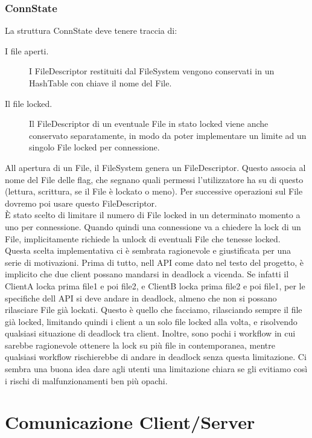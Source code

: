 \documentclass[11pt]{article}
\begin{document}
\begin{flushleft}
\subsubsection{ConnState}

La struttura ConnState deve tenere traccia di:
\begin{description}

\item[I file aperti.] I FileDescriptor restituiti dal FileSystem vengono conservati in un HashTable con chiave il nome del File.

\item[Il file locked.] Il FileDescriptor di un eventuale File in stato locked viene anche conservato separatamente, in modo da poter implementare un limite ad un singolo File locked per connessione.

\end{description}
All apertura  di un File, il FileSystem genera un FileDescriptor. Questo associa al nome del File delle flag, che segnano quali permessi l'utilizzatore ha su di questo (lettura, scrittura, se il File è lockato o meno). Per successive operazioni sul File dovremo poi usare questo FileDescriptor.
\\
È stato scelto di limitare il numero di File locked in un determinato momento a uno per connessione. Quando quindi una connessione va a chiedere la lock di un File, implicitamente richiede la unlock di eventuali File che tenesse locked.
Questa scelta implementativa ci è sembrata ragionevole e giustificata per una serie di motivazioni.
Prima di tutto, nell API come dato nel testo del progetto, è implicito che due client possano mandarsi in deadlock a vicenda. Se infatti il ClientA locka prima file1 e poi file2, e ClientB locka prima file2 e poi file1, per le specifiche dell API si deve andare in deadlock, almeno che non si possano rilasciare File già lockati. Questo è quello che facciamo, rilasciando sempre il file già locked, limitando quindi i client a un solo file locked alla volta, e risolvendo qualsiasi situazione di deadlock tra client.
Inoltre, sono pochi i workflow in cui sarebbe ragionevole ottenere la lock su più file in contemporanea, mentre qualsiasi workflow rischierebbe di andare in deadlock senza questa limitazione.
Ci sembra una buona idea dare agli utenti una limitazione chiara se gli evitiamo così i rischi di malfunzionamenti ben più opachi. 

\section{Comunicazione Client/Server}


\end{flushleft}
\end{document}

